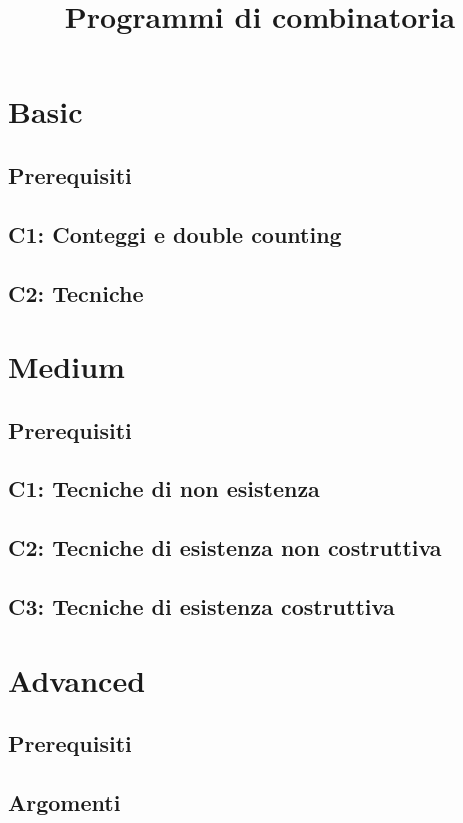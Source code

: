 \documentclass[a4paper,10pt]{article}
\title{Programmi di combinatoria}
\author{}
\begin{document}
\maketitle

\section{Basic}
\subsection{Prerequisiti}
\subsection{C1: Conteggi e double counting}
\subsection{C2: Tecniche}

\section{Medium}
\subsection{Prerequisiti}
\subsection{C1: Tecniche di non esistenza}
\subsection{C2: Tecniche di esistenza non costruttiva}
\subsection{C3: Tecniche di esistenza costruttiva}

\section{Advanced}
\subsection{Prerequisiti}
\subsection{Argomenti}
\end{document}
